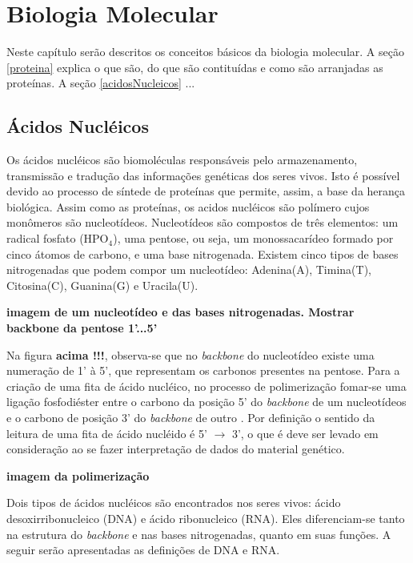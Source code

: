 \chapter{Biologia Molecular}
 
\indent Neste capítulo serão descritos os conceitos básicos da biologia molecular. A seção \ref{proteina} explica o que são, do que são contituídas e como são arranjadas as proteínas. A seção \ref{acidosNucleicos} ...







\section{Ácidos Nucléicos} \label{aceidosNucleicos}

\indent Os ácidos nucléicos são biomoléculas responsáveis pelo armazenamento, transmissão e tradução das informações genéticas dos seres vivos. Isto é possível devido ao processo de síntede de proteínas que permite, assim, a base da herança biológica. Assim como as proteínas, os acidos nucléicos são polímero cujos monômeros são nucleotídeos. Nucleotídeos são compostos de três elementos: um radical fosfato (HPO$_{4}$), uma pentose, ou seja, um monossacarídeo formado por cinco átomos de carbono, e uma base nitrogenada. Existem cinco tipos de bases nitrogenadas que podem compor um nucleotídeo: Adenina(A), Timina(T), Citosina(C), Guanina(G) e Uracila(U).

\indent \textbf{imagem de um nucleotídeo e das bases nitrogenadas. Mostrar backbone da pentose 1'...5'}

\indent Na figura \textbf{acima !!!}, observa-se que no \textit{backbone} do nucleotídeo existe uma numeração de 1' à 5', que representam os carbonos presentes na pentose. Para a criação de uma fita de ácido nucléico, no processo de polimerização fomar-se uma ligação fosfodiéster entre o carbono da posição 5' do \textit{backbone} de um nucleotídeos e o carbono de posição 3' do \textit{backbone} de outro \cite{setubal97}. Por definição o sentido da leitura de uma fita de ácido nucléido é 5' $\rightarrow$ 3', o que é deve ser levado em consideração ao se fazer interpretação de dados do material genético.

\indent \textbf{imagem da polimerização}

\indent Dois tipos de ácidos nucléicos são encontrados nos seres vivos: ácido desoxirribonucleico (DNA) e ácido ribonucleico (RNA). Eles diferenciam-se tanto na estrutura do \textit{backbone} e nas bases nitrogenadas, quanto em suas funções. A seguir serão apresentadas as definições de DNA e RNA.

